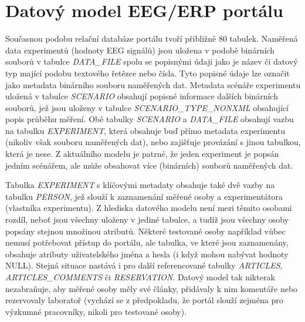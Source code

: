 \documentclass{projekt}
\begin{document}
\section{Datový model EEG/ERP portálu}
\hspace{0.65cm}Současnou podobu relační databáze portálu tvoří přibližně 80 tabulek. Naměřená data experimentů (hodnoty EEG signálů) jsou uložena v podobě binárních souborů v tabulce {\it DATA\_FILE} spolu se popisnými údaji jako je název či datový typ mající podobu textového řetězce nebo čísla. Tyto popisné údaje lze označit jako metadata binárního souboru naměřených dat. Metadata scénáře experimentu uložená v tabulce {\it SCENARIO} obsahují popisné informace dalších binárních souborů, jež jsou uloženy v tabulce {\it SCENARIO\_TYPE\_NONXML} obsahující popis průběhu měření. Obě tabulky {\it SCENARIO} a {\it DATA\_FILE} obsahují vazbu na tabulku {\it EXPERIMENT}, která obsahuje buď přímo metadata experimentu (nikoliv však souboru naměřených dat), nebo zajišťuje provázání s jinou tabulkou, která je nese. Z aktuálního modelu je patrné, že jeden experiment je popsán jedním scénářem, ale může obsahovat více (binárních) souborů naměřených dat.

Tabulka {\it EXPERIMENT} s klíčovými metadaty obsahuje také dvě vazby na tabulku {\it PERSON}, jež slouží k zaznamenání měřené osoby a experimentátora (vlastníka experimentu). Z hlediska datového modelu není mezi těmito osobami rozdíl, neboť jsou všechny uloženy v jediné tabulce, a tudíž jsou všechny osoby popsány stejnou množinou atributů. Některé testované osoby například vůbec nemusí potřebovat přístup do portálu, ale tabulka, ve které jsou zaznamenány, obsahuje atributy uživatelského jména a hesla (i když mohou nabývat hodnoty NULL). Stejná situace nastává i pro další referencované tabulky {\it ARTICLES}, {\it ARTICLES\_COMMENTS} či {\it RESERVATION}. Datový model tak nikterak nezabraňuje, aby měřené osoby měly své články, přidávaly k nim komentáře nebo rezervovaly laboratoř (vychází se z předpokladu, že portál slouží zejména pro výzkumné pracovníky, nikoli pro testované osoby). 
\end{document}
